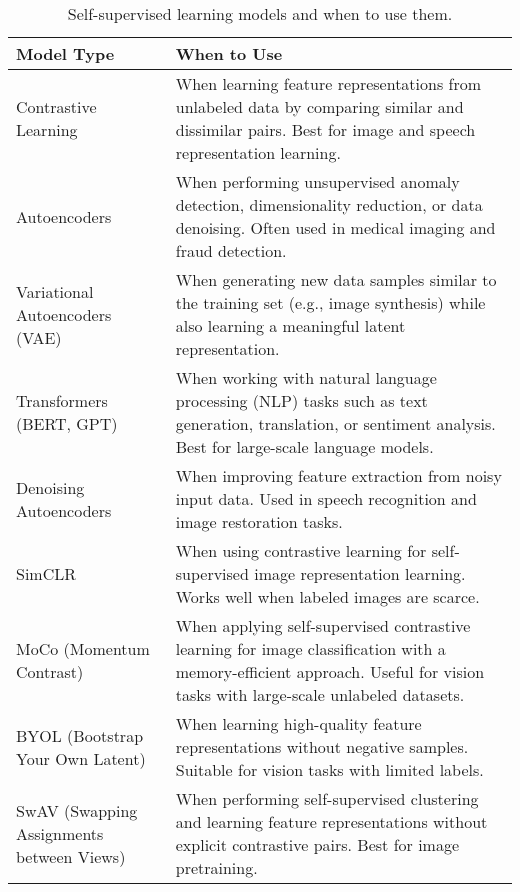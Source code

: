 \documentclass[12pt,openany, draft]{book}
\begin{document}
\begin{table}[H]
    \centering
    \small
    \renewcommand{\arraystretch}{1.3} %
    \begin{tabular}{|l|p{8cm}|}
        \hline
        \textbf{Model Type} & \textbf{When to Use} \\
        \hline
        Contrastive Learning & When learning feature representations from unlabeled data by comparing similar and dissimilar pairs. Best for image and speech representation learning. \\
        \hline
        Autoencoders & When performing unsupervised anomaly detection, dimensionality reduction, or data denoising. Often used in medical imaging and fraud detection. \\
        \hline
        Variational Autoencoders (VAE) & When generating new data samples similar to the training set (e.g., image synthesis) while also learning a meaningful latent representation. \\
        \hline
        Transformers (BERT, GPT) & When working with natural language processing (NLP) tasks such as text generation, translation, or sentiment analysis. Best for large-scale language models. \\
        \hline
        Denoising Autoencoders & When improving feature extraction from noisy input data. Used in speech recognition and image restoration tasks. \\
        \hline
        SimCLR & When using contrastive learning for self-supervised image representation learning. Works well when labeled images are scarce. \\
        \hline
        MoCo (Momentum Contrast) & When applying self-supervised contrastive learning for image classification with a memory-efficient approach. Useful for vision tasks with large-scale unlabeled datasets. \\
        \hline
        BYOL (Bootstrap Your Own Latent) & When learning high-quality feature representations without negative samples. Suitable for vision tasks with limited labels. \\
        \hline
        SwAV (Swapping Assignments between Views) & When performing self-supervised clustering and learning feature representations without explicit contrastive pairs. Best for image pretraining. \\
        \hline
    \end{tabular}
    \caption{Self-supervised learning models and when to use them.}
\end{table}
\end{document}
